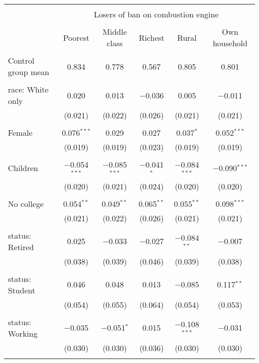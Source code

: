 
\begin{tabular}{@{\extracolsep{5pt}}lccccc} 
\\[-1.8ex]\hline 
\hline \\[-1.8ex] 
 & \multicolumn{5}{c}{Losers of ban on combustion engine} \\ 
\cline{2-6} 
\\[-1.8ex] & Poorest & Middle class & Richest & Rural & Own household \\ 
\hline \\[-1.8ex] 
 Control group mean & 0.834 & 0.778 & 0.567 & 0.805 & 0.801  \\ \hline \\[-1.8ex] race: White only & 0.020 & 0.013 & $-$0.036 & 0.005 & $-$0.011 \\ 
  & (0.021) & (0.022) & (0.026) & (0.021) & (0.021) \\ 
  & & & & & \\ 
 Female & 0.076$^{***}$ & 0.029 & 0.027 & 0.037$^{*}$ & 0.052$^{***}$ \\ 
  & (0.019) & (0.019) & (0.023) & (0.019) & (0.019) \\ 
  & & & & & \\ 
 Children & $-$0.054$^{***}$ & $-$0.085$^{***}$ & $-$0.041$^{*}$ & $-$0.084$^{***}$ & $-$0.090$^{***}$ \\ 
  & (0.020) & (0.021) & (0.024) & (0.020) & (0.020) \\ 
  & & & & & \\ 
 No college & 0.054$^{**}$ & 0.049$^{**}$ & 0.065$^{**}$ & 0.055$^{**}$ & 0.098$^{***}$ \\ 
  & (0.021) & (0.022) & (0.026) & (0.021) & (0.021) \\ 
  & & & & & \\ 
 status: Retired & 0.025 & $-$0.033 & $-$0.027 & $-$0.084$^{**}$ & $-$0.007 \\ 
  & (0.038) & (0.039) & (0.046) & (0.039) & (0.038) \\ 
  & & & & & \\ 
 status: Student & 0.046 & 0.048 & 0.013 & $-$0.085 & 0.117$^{**}$ \\ 
  & (0.054) & (0.055) & (0.064) & (0.054) & (0.053) \\ 
  & & & & & \\ 
 status: Working & $-$0.035 & $-$0.051$^{*}$ & 0.015 & $-$0.108$^{***}$ & $-$0.031 \\ 
  & (0.030) & (0.030) & (0.036) & (0.030) & (0.030) \\ 
  & & & & & \\ 

\end{tabular}
